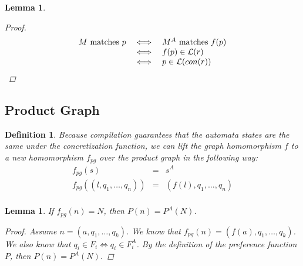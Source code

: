 \documentclass[twocolumn]{sig-alternate-10pt}
\newtheorem{defn}{Definition}
\newtheorem{lem}[thm]{Lemma}
\begin{document}
\begin{lem}
\begin{proof}
    \[ \begin{array}{lll}
      M ~\text{matches}~ p &\iff& M^A ~\text{matches}~ f(p) \\
                         &\iff& f(p) \in \mathcal{L}(r) \\
                         &\iff& p \in \mathcal{L}(con(r)) \\
    \end{array} \]%

  \end{proof}

\end{lem}


\subsection{Product Graph}

\begin{defn}
  Because compilation guarantees that the automata states are the same under the concretization function, we can lift the graph homomorphism $f$ to a new homomorphism $f_{pg}$ over the product graph in the following way:
  \[ \begin{array}{rcl}
    f_{pg}( s ) & = & s^A  \\
    f_{pg}( (l,q_1,\ldots,q_n) ) & = & (f(l),q_1,\ldots,q_n) \\
  \end{array} \]
\end{defn}

\begin{lem}
  If $f_{pg}(n) = N$, then $P(n) = P^A(N)$.

  \begin{proof}
    Assume $n = (a,q_1,\dots,q_k)$. We know that $f_{pg}(n) = (f(a),q_1,\dots,q_k)$. 
    We also know that $q_i \in F_i \iff q_i \in F^A_i$. 
    By the definition of the preference function $P$, then $P(n) = P^A(N)$.
  \end{proof}

\end{lem}
\end{document}
